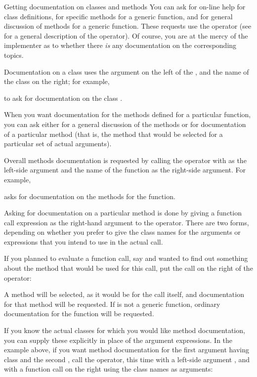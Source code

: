 \begin{Section}{Getting documentation on classes and methods}
You can ask for on-line help for class definitions, for specific
methods for a generic function, and for general discussion of
methods for a generic function.  These requests use the 
operator (see  for a general description of
the operator).  Of course, you are at the mercy of the implementer
as to whether there \emph{is} any documentation on the corresponding
topics.

Documentation on a class uses the argument  on the left
of the , and the name of the class on the right; for
example,


to ask for documentation on the class .

When you want documentation for the methods defined for a particular
function, you can ask either for a general discussion of the methods
or for documentation of a particular method (that is, the method that
would be selected for a particular set of actual arguments).

Overall methods documentation is requested by
calling the  operator with  as the left-side
argument and the name of the function as the right-side argument. For
example,


asks for documentation on the methods for the 
function.

Asking for documentation on a particular method is done by giving a
function call expression as the right-hand argument to the 
operator.  There are two forms, depending on whether you prefer to
give the class names for the arguments or expressions that you intend
to use in the actual call.

If you planned to evaluate a function call, say 
and wanted to find out something about the method that would be used
for this call, put the call on the right of the  operator:


A method will be selected, as it would be for the call itself, and
documentation for that method will be requested.  If  is
not a generic function, ordinary documentation for the function will
be requested.

If you know the actual classes for which you would like method
documentation, you can supply these explicitly in place of the
argument expressions.  In the example above, if you want method
documentation for the first argument having class 
and the second , call the  operator, this
time with a left-side argument , and with a function call
on the right using the class names as arguments:


\end{Section}
